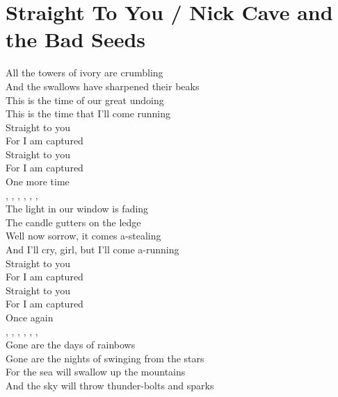 \section{Straight To You / Nick Cave and the Bad Seeds}\label{sec:straighttoyou}

  \Cmajor
  \Gmajor
  \Fmajor
  \Aminor
  
  
 All the towers of ivory are  crumbling \\
 And the swallows have sharpened their  beaks \\
  This is the time of our great undoing \\
This is the  time that I'll come  running \\
 Straight to you \\
 For I am captured \\
 Straight to you \\
 For I am captured \\
One more   time\\
, , , , , , \\
 The light in our window is  fading \\
 The candle gutters on the  ledge \\
  Well now sorrow, it comes a-stealing \\
And I'll  cry, girl, but I'll come a-running \\
 Straight to you \\
 For I am captured \\
 Straight to you \\
 For I am captured \\
Once again \\
, , , , , , \\
 Gone are the days of  rainbows \\
 Gone are the nights of swinging from the  stars \\
  For the sea will swallow up the  mountains \\
And the  sky will throw thunder-bolts and  sparks \\
